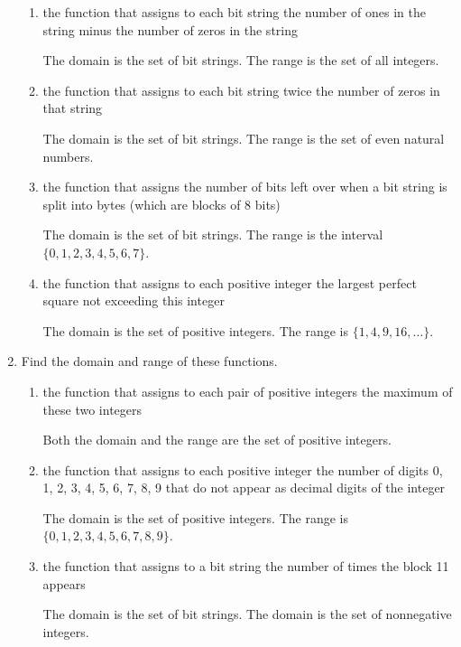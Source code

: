 \documentclass[11pt]{article}
\begin{document}
\begin{enumerate}[label=\textbf{\arabic*.}]
	\begin{enumerate}[label=\textbf{\alph*)}]
		\item the function that assigns to each bit string the number of ones in the string minus the number of zeros in the string
		
		The domain is the set of bit strings. The range is the set of all integers.
		
		\item the function that assigns to each bit string twice the number of zeros in that string
		
		The domain is the set of bit strings. The range is the set of even natural numbers.
		
		\item the function that assigns the number of bits left over when a bit string is split into bytes (which are blocks of 8 bits)
		
		The domain is the set of bit strings. The range is the interval $\{0, 1, 2, 3, 4, 5, 6, 7\}$.
		
		\item the function that assigns to each positive integer the largest perfect square not exceeding this integer
		
		The domain is the set of positive integers. The range is $\{1, 4, 9, 16, \ldots\}$.
	\end{enumerate}

	\item Find the domain and range of these functions.
	
	\begin{enumerate}[label=\textbf{\alph*)}]
		\item the function that assigns to each pair of positive integers the maximum of these two integers
		
		Both the domain and the range are the set of positive integers.
		
		\item the function that assigns to each positive integer the number of digits 0, 1, 2, 3, 4, 5, 6, 7, 8, 9 that do not appear as decimal digits of the integer
		
		The domain is the set of positive integers. The range is $\{0, 1, 2, 3, 4, 5, 6, 7, 8, 9\}$.
		
		\item the function that assigns to a bit string the number of times the block 11 appears
		
		The domain is the set of bit strings. The domain is the set of nonnegative integers.
		

\end{enumerate}
\end{enumerate}
\end{document}
